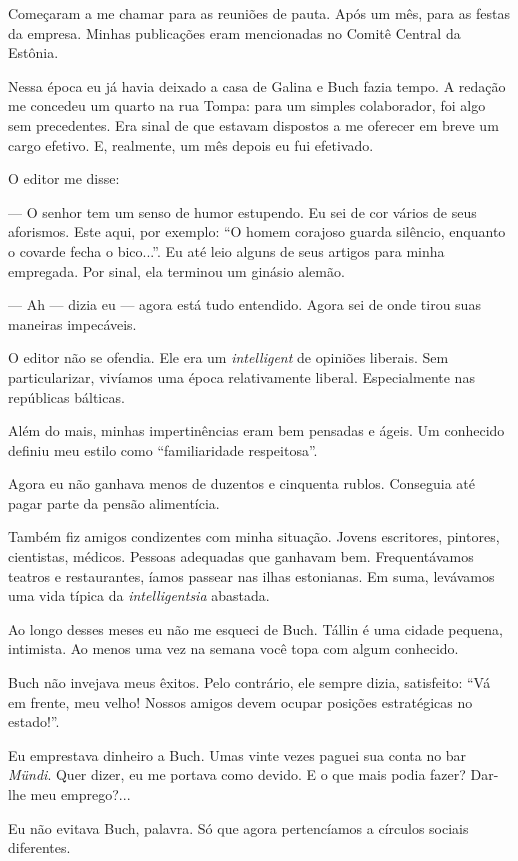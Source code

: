 Começaram a me chamar para as reuniões de pauta. Após um mês, para as
festas da empresa. Minhas publicações eram mencionadas no Comitê Central
da Estônia.

Nessa época eu já havia deixado a casa de Galina e Buch fazia tempo. A
redação me concedeu um quarto na rua Tompa: para um simples colaborador,
foi algo sem precedentes. Era sinal de que estavam dispostos a me
oferecer em breve um cargo efetivo. E, realmente, um mês depois eu fui
efetivado.

O editor me disse:

--- O senhor tem um senso de humor estupendo. Eu sei de cor vários de
seus aforismos. Este aqui, por exemplo: ``O homem corajoso guarda
silêncio, enquanto o covarde fecha o bico...''. Eu até leio alguns de
seus artigos para minha empregada. Por sinal, ela terminou um ginásio
alemão.

--- Ah --- dizia eu --- agora está tudo entendido. Agora sei de onde
tirou suas maneiras impecáveis.

O editor não se ofendia. Ele era um \emph{intelligent} de opiniões
liberais. Sem particularizar, vivíamos uma época relativamente liberal.
Especialmente nas repúblicas bálticas.

Além do mais, minhas impertinências eram bem pensadas e ágeis. Um
conhecido definiu meu estilo como ``familiaridade respeitosa''.

Agora eu não ganhava menos de duzentos e cinquenta rublos. Conseguia até
pagar parte da pensão alimentícia.

Também fiz amigos condizentes com minha situação. Jovens escritores,
pintores, cientistas, médicos. Pessoas adequadas que ganhavam bem.
Frequentávamos teatros e restaurantes, íamos passear nas ilhas
estonianas. Em suma, levávamos uma vida típica da \emph{intelligentsia}
abastada.

Ao longo desses meses eu não me esqueci de Buch. Tállin é uma cidade
pequena, intimista. Ao menos uma vez na semana você topa com algum
conhecido.

Buch não invejava meus êxitos. Pelo contrário, ele sempre dizia,
satisfeito: ``Vá em frente, meu velho! Nossos amigos devem ocupar
posições estratégicas no estado!''.

Eu emprestava dinheiro a Buch. Umas vinte vezes paguei sua conta no bar
\emph{Mündi}. Quer dizer, eu me portava como devido. E o que mais podia
fazer? Dar-lhe meu emprego?...

Eu não evitava Buch, palavra. Só que agora pertencíamos a círculos
sociais diferentes.

